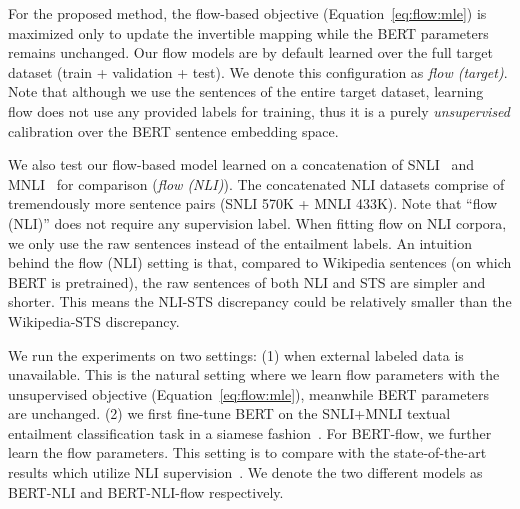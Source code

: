 \documentclass[11pt,a4paper]{article}
\begin{document}
For the proposed method, the flow-based objective (Equation~\ref{eq:flow:mle}) is maximized only to update the invertible mapping while the BERT parameters remains unchanged. Our flow models are by default learned over the full target dataset (train + validation + test).
We denote this configuration as \textit{flow (target)}. Note that although we use the sentences of the entire target dataset, learning flow does not use any provided labels for training, thus it is a purely \emph{unsupervised} calibration over the BERT sentence embedding space. 


We also test our flow-based model learned on a concatenation of SNLI~\citep{snli} and MNLI~\citep{mnli} for comparison (\emph{flow (NLI)}). The concatenated NLI datasets comprise of tremendously more sentence pairs (SNLI 570K + MNLI 433K). Note that ``flow (NLI)'' does not require any supervision label. When fitting flow on NLI corpora, we only use the raw sentences instead of the entailment labels. An intuition behind the flow (NLI) setting is that, compared to Wikipedia sentences (on which BERT is pretrained), the raw sentences of both NLI and STS are simpler and shorter. This means the NLI-STS discrepancy could be relatively smaller than the Wikipedia-STS discrepancy.

We run the experiments on two settings: (1) when external labeled data is unavailable. This is the natural setting where we learn flow parameters with the unsupervised objective (Equation~\ref{eq:flow:mle}), meanwhile BERT parameters are unchanged. (2) we first fine-tune BERT on the SNLI+MNLI textual entailment classification task in a siamese fashion~\citep{reimers2019sentence}. For BERT-flow, we further learn the flow parameters. This setting is to compare with the state-of-the-art results which utilize NLI supervision~\citep{reimers2019sentence}. We denote the two different models as BERT-NLI and BERT-NLI-flow respectively.
\end{document}
